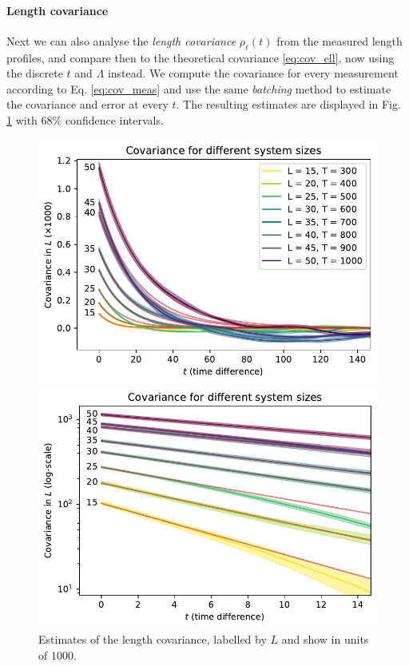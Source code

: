 \paragraph{Length covariance}
Next we can also analyse the \emph{length covariance} $\rho_\ell(t)$ from the measured length profiles, and compare then to the theoretical covariance \eqref{eq:cov_ell}, now using the discrete $t$ and $\Lambda$ instead.
We compute the covariance for every measurement according to Eq. \eqref{eq:cov_meas} and use the same \emph{batching} method to estimate the covariance and error at every $t$.
The resulting estimates are displayed in Fig. \ref{fig:cov_plot} with $68\%$ confidence intervals.
\begin{figure}[ht]
    \begin{minipage}[t]{0.49\linewidth}
        \centering
        \includegraphics[width=\linewidth]{img/cov_L.pdf}
        \caption{Estimates of the length covariance, labelled by $L$ and show in units of $1000$.}
        \label{fig:cov_plot}
    \end{minipage}
    \hfill
    \begin{minipage}[t]{0.49\linewidth}
        \centering
        \includegraphics[width=\linewidth]{img/cov_L_log.pdf}

\end{minipage}
\end{figure}
